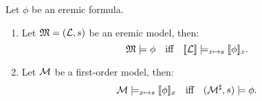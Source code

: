 \begin{theorem}\label{correspondence:theorem}
Let $\phi$ be an eremic formula.
\begin{enumerate}
 
\item\label{correspondence:theorem:1} Let $\frak{M} = (\mathcal{L}, s)$ be an
  eremic model, then:
\[
   \frak{M} \models \phi \quad  \text{iff} \quad \lbrack\!\lbrack \mathcal{L} \rbrack\!\rbrack \models_{x \mapsto s} \lbrack\!\lbrack \phi \rbrack\!\rbrack_x.
\]

\item\label{correspondence:theorem:2} Let $\mathcal{M}$ be a first-order
  model, then:
\[
   \mathcal{M} \models_{x \mapsto s} \lbrack\!\lbrack \phi \rbrack\!\rbrack_x 
      \quad  \text{iff} \quad  
   (\mathcal{M}^{\sharp}, s) \models \phi.
\]

\end{enumerate}

\end{theorem}

